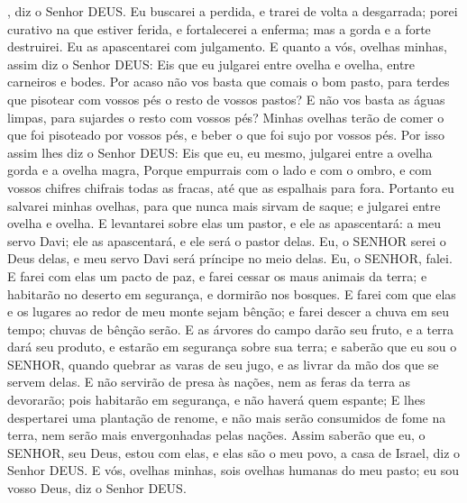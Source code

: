 {{} , diz o Senhor DEUS.
Eu buscarei a perdida, e trarei de volta a desgarrada; porei curativo na que estiver ferida, e fortalecerei a enferma; mas a gorda e a forte destruirei. Eu as apascentarei com julgamento.
E quanto a vós, ovelhas minhas, assim diz o Senhor DEUS: Eis que eu julgarei entre ovelha e ovelha, entre carneiros e bodes.
Por acaso não vos basta que comais o bom pasto, para terdes que pisotear com vossos pés o resto de vossos pastos? E não vos basta as águas limpas, para sujardes o resto
{} com vossos pés?
Minhas ovelhas terão de comer o que foi pisoteado por vossos pés, e beber o que foi sujo por vossos pés.
Por isso assim lhes diz o Senhor DEUS: Eis que eu, eu mesmo, julgarei entre a ovelha gorda e a ovelha magra,
Porque empurrais com o lado e com o ombro, e com vossos chifres chifrais todas as fracas, até que as espalhais para fora.
Portanto eu salvarei minhas ovelhas, para que nunca mais sirvam de saque; e julgarei entre ovelha e ovelha.
E levantarei sobre elas um pastor, e ele as apascentará: a meu servo Davi; ele as apascentará, e ele será o pastor delas.
Eu, o SENHOR serei o Deus delas, e meu servo Davi será príncipe no meio delas. Eu, o SENHOR, falei.
E farei com elas um pacto de paz, e farei cessar os maus animais da terra; e habitarão no deserto em segurança, e dormirão nos bosques.
E farei com que elas e os lugares ao redor de meu monte sejam bênção; e farei descer a chuva em seu tempo; chuvas de bênção serão.
E as árvores do campo darão seu fruto, e a terra dará seu produto, e estarão em segurança sobre sua terra; e saberão que eu sou o SENHOR, quando quebrar as varas de seu jugo, e as livrar da mão dos que se servem delas.
E não
{} servirão de presa às nações, nem as feras da terra as devorarão; pois habitarão em segurança, e não haverá quem
{} espante;
E lhes despertarei uma plantação de renome, e não mais serão consumidos de fome na terra, nem serão mais envergonhadas pelas nações.
Assim saberão que eu, o SENHOR, seu Deus, estou com elas, e elas são o meu povo, a casa de Israel, diz o Senhor DEUS.
E vós, ovelhas minhas, sois ovelhas humanas do meu pasto; eu sou vosso Deus, diz o Senhor DEUS.

}
